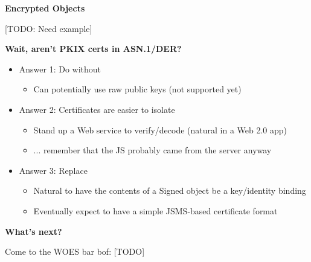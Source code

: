 \documentclass[helvetica]{seminar}
\newcommand{\heading}[1]{%
  \begin{center} 
    \large\bf 
    #1 
  \end{center} 
  \vspace{.4 in}}
\begin{document}
\begin{slide}
\heading{Encrypted Objects}

[TODO: Need example]
\end{slide}



\begin{slide}
\heading{Wait, aren't PKIX certs in ASN.1/DER?}

\vspace{-.1in}
\begin{itemize}
\item Answer 1: Do without
  \begin{itemize}
  \item Can potentially use raw public keys (not supported yet)
  \end{itemize}

\item Answer 2: Certificates are easier to isolate
  \begin{itemize}
  \item Stand up a Web service to verify/decode (natural in a Web 2.0 app)
  \item ... remember that the JS probably came from the server anyway
  \end{itemize}

\item Answer 3: Replace
  \begin{itemize}
  \item Natural to have the contents of a Signed object be a key/identity binding
  \item Eventually expect to have a simple JSMS-based certificate format
  \end{itemize}

\end{itemize}

\end{slide}


\begin{slide}
\heading{What's next?}

Come to the WOES bar bof: [TODO]


\end{slide}
\end{document}
